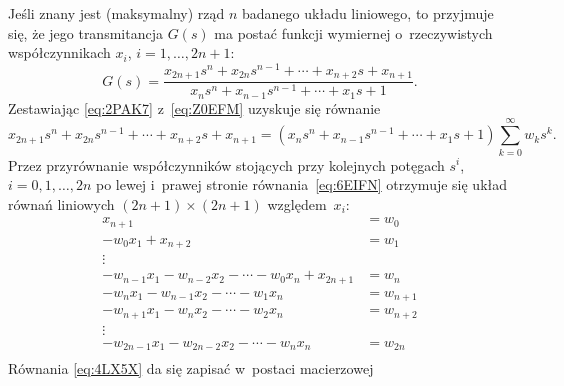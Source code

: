 \documentclass[paper=a4,DIV=12]{lpas}
\begin{document}
\begin{appendices}
  Jeśli znany jest (maksymalny) rząd $n$ badanego układu liniowego, to
  przyjmuje się, że jego transmitancja $G(s)$ ma postać funkcji wymiernej
  o~rzeczywistych współczynnikach $x_i$, $i=1,\dots,2n+1$:
  \begin{equation}
    G(s) = \frac{x_{2n+1} s^n + x_{2n} s^{n-1} + \cdots + x_{n+2} s + x_{n+1}}
                {x_n s^n + x_{n-1} s^{n-1} + \cdots + x_1 s + 1}.
    \label{eq:Z0EFM}
  \end{equation}
  Zestawiając \eqref{eq:2PAK7} z~\eqref{eq:Z0EFM} uzyskuje się równanie
  \begin{equation}
      x_{2n+1} s^n + x_{2n} s^{n-1} + \cdots + x_{n+2} s + x_{n+1}
      = \left(
          x_n s^n + x_{n-1} s^{n-1} + \cdots + x_1 s + 1
        \right) \sum_{k=0}^{\infty} w_k s^k.
    \label{eq:6EIFN}
  \end{equation}
  Przez przyrównanie współczynników stojących przy kolejnych potęgach $s^i$,
  $i=0,1,\dots,2n$ po lewej i~prawej stronie równania~\eqref{eq:6EIFN}
  otrzymuje się układ równań liniowych $(2n+1) \times (2n+1)$ względem~$x_i$:
  \begin{equation}
    \begin{aligned}
      x_{n+1} & = w_0 \\
    - w_0 x_1 + x_{n+2} & = w_1 \\
      \vdots  & \\
   -  w_{n-1} x_1 - w_{n-2} x_2 - \cdots - w_0 x_n + x_{2n+1} &= w_n \\
      - w_n x_1 - w_{n-1} x_2 - \cdots - w_1 x_n &=  w_{n+1} \\
      - w_{n+1} x_1 - w_n x_2 - \cdots - w_2 x_n & = w_{n+2} \\
      \vdots & \\
      - w_{2n-1} x_1 - w_{2n-2} x_2 - \cdots - w_n x_n & = w_{2n} \\
    \end{aligned}
    \label{eq:4LX5X}
  \end{equation}
  Równania \eqref{eq:4LX5X} da się zapisać w~postaci macierzowej

\end{appendices}
\end{document}
